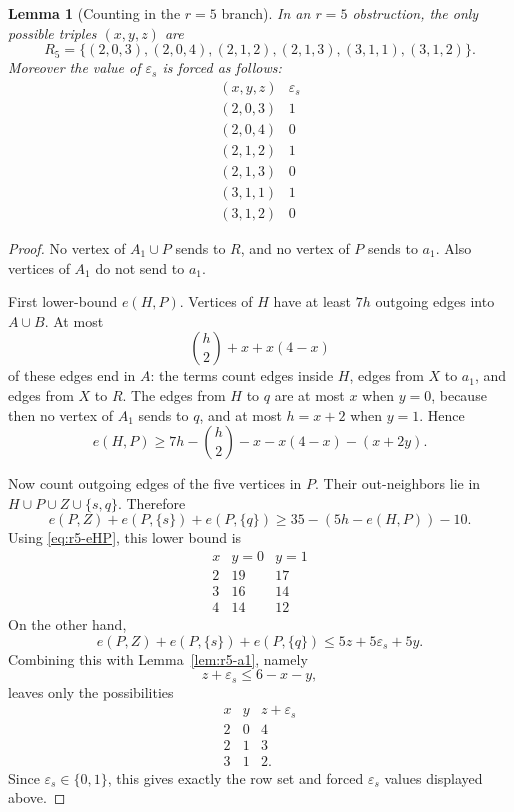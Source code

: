 \documentclass[a4paper,fleqn]{cas-sc}
\newtheorem{lemma}[theorem]{Lemma}
\theoremstyle{definition}
\begin{document}
\begin{lemma}[Counting in the $r=5$ branch]\label{lem:r5-counting}
In an $r=5$ obstruction, the only possible triples $(x,y,z)$ are
\begin{equation}\label{eq:R5rows}
R_5=\{(2,0,3),(2,0,4),(2,1,2),(2,1,3),(3,1,1),(3,1,2)\}.
\end{equation}
Moreover the value of $\varepsilon_s$ is forced as follows:
\[
\begin{array}{c|c}
(x,y,z)&\varepsilon_s\\ \hline
(2,0,3)&1\\
(2,0,4)&0\\
(2,1,2)&1\\
(2,1,3)&0\\
(3,1,1)&1\\
(3,1,2)&0
\end{array}
\]
\end{lemma}
\begin{proof}
No vertex of $A_1\cup P$ sends to $R$, and no vertex of $P$ sends to $a_1$.  Also vertices of $A_1$ do not send to $a_1$.

First lower-bound $e(H,P)$.  Vertices of $H$ have at least $7h$ outgoing edges into $A\cup B$.  At most
\[
\binom{h}{2}+x+x(4-x)
\]
of these edges end in $A$: the terms count edges inside $H$, edges from $X$ to $a_1$, and edges from $X$ to $R$.  The edges from $H$ to $q$ are at most $x$ when $y=0$, because then no vertex of $A_1$ sends to $q$, and at most $h=x+2$ when $y=1$.  Hence
\begin{equation}\label{eq:r5-eHP}
e(H,P)\ge 7h-\binom{h}{2}-x-x(4-x)-(x+2y).
\end{equation}

Now count outgoing edges of the five vertices in $P$.  Their out-neighbors lie in $H\cup P\cup Z\cup\{s,q\}$.  Therefore
\[
e(P,Z)+e(P,\{s\})+e(P,\{q\})
\ge 35-(5h-e(H,P))-10.
\]
Using \eqref{eq:r5-eHP}, this lower bound is
\[
\begin{array}{c|cc}
 x&y=0&y=1\\ \hline
 2&19&17\\
 3&16&14\\
 4&14&12
\end{array}
\]
On the other hand,
\[
e(P,Z)+e(P,\{s\})+e(P,\{q\})\le 5z+5\varepsilon_s+5y.
\]
Combining this with Lemma~\ref{lem:r5-a1}, namely
\[
z+\varepsilon_s\le 6-x-y,
\]
leaves only the possibilities
\[
\begin{array}{c|c|c}
x&y&z+\varepsilon_s\\ \hline
2&0&4\\
2&1&3\\
3&1&2.
\end{array}
\]
Since $\varepsilon_s\in\{0,1\}$, this gives exactly the row set and forced $\varepsilon_s$ values displayed above.
\end{proof}
\end{document}
